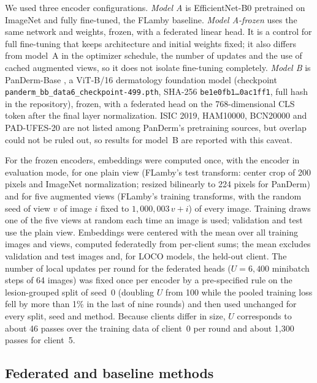 \documentclass[VANCOUVER,Times1COL]{WileyNJDv5}
\begin{document}
We used three encoder configurations. \emph{Model A} is EfficientNet-B0 \cite{tan2019efficientnet}
pretrained on ImageNet \cite{deng2009imagenet} and fully fine-tuned, the FLamby baseline. \emph{Model
A-frozen} uses the same network and weights, frozen, with a federated linear head. It is a control for
full fine-tuning that keeps architecture and initial weights fixed; it also differs from model~A in the
optimizer schedule, the number of updates and the use of cached augmented views, so it does not isolate
fine-tuning completely. \emph{Model B} is PanDerm-Base \cite{yan2025panderm}, a ViT-B/16
\cite{dosovitskiy2021vit} dermatology foundation model (checkpoint
\texttt{panderm\_bb\_data6\_checkpoint-499.pth}, SHA-256 \texttt{be1e0fb1\ldots0ac1ff1}, full hash in the
repository), frozen, with a federated head on the 768-dimensional
CLS token after the final layer normalization. ISIC 2019, HAM10000, BCN20000 and PAD-UFES-20 are not
listed among PanDerm's pretraining sources, but overlap could not be ruled out, so results for model~B
are reported with this caveat.

For the frozen encoders, embeddings were computed once, with the encoder in evaluation mode, for one
plain view (FLamby's test transform: center crop of 200 pixels and ImageNet normalization; resized
bilinearly to 224 pixels for PanDerm) and for five augmented views (FLamby's training transforms, with
the random seed of view $v$ of image $i$ fixed to $1{,}000{,}003\,v+i$) of every image. Training draws one
of the five views at random each time an image is used; validation and test use the plain view.
Embeddings were centered with the mean over all training images and views, computed federatedly from
per-client sums; the mean excludes validation and test images and, for LOCO models, the held-out
client. The number of local updates per round for the federated heads ($U=6{,}400$ minibatch steps of 64
images) was fixed once per encoder by a pre-specified rule on the lesion-grouped split of seed~0
(doubling $U$ from 100 while the pooled training loss fell by more than 1\% in the last of nine rounds)
and then used unchanged for every split, seed and method. Because clients differ in size, $U$ corresponds
to about 46 passes over the training data of client~0 per round and about 1,300 passes for client~5.

\subsection{Federated and baseline methods}
\label{sec:methods-fl}
\end{document}
